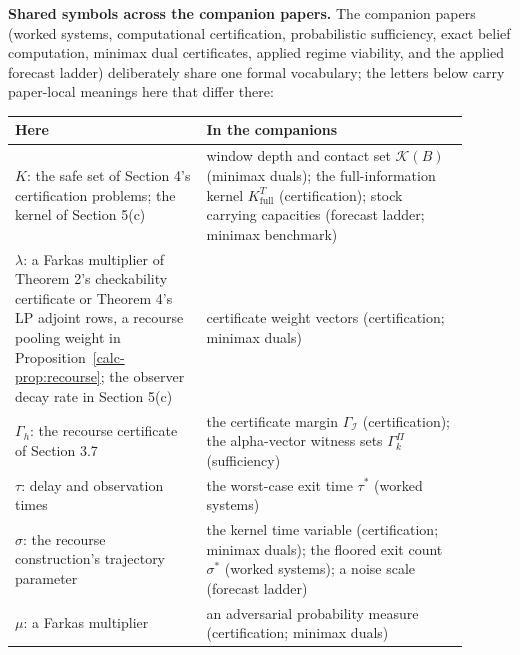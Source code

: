 \documentclass[10pt,twocolumn]{article}
\theoremstyle{definition}
\begin{document}
\medskip
\noindent\textbf{Shared symbols across the companion papers.} The
companion papers (worked systems, computational certification,
probabilistic sufficiency, exact belief computation, minimax dual
certificates, applied regime viability, and the applied forecast ladder)
deliberately share one formal vocabulary; the letters below carry
paper-local meanings here that differ there:
\begin{center}\small
\begin{tabular}{@{}p{0.38\linewidth}p{0.52\linewidth}@{}}
\toprule
\textbf{Here} & \textbf{In the companions} \\
\midrule
\(K\): the safe set of Section 4's certification problems; the kernel of Section 5(c) & window depth and contact set \(\mathcal{K}(B)\) (minimax duals); the full-information kernel \(K^{T}_{\mathrm{full}}\) (certification); stock carrying capacities (forecast ladder; minimax benchmark) \\
\(\lambda\): a Farkas multiplier of Theorem 2's checkability certificate or Theorem 4's LP adjoint rows, a recourse pooling weight in Proposition~\ref{calc-prop:recourse}; the observer decay rate in Section 5(c) & certificate weight vectors (certification; minimax duals) \\
\(\Gamma_{h}\): the recourse certificate of Section 3.7 & the certificate margin \(\Gamma_{\mathcal{I}}\) (certification); the alpha-vector witness sets \(\Gamma^{\Pi}_{k}\) (sufficiency) \\
\(\tau\): delay and observation times & the worst-case exit time \(\tau^{*}\) (worked systems) \\
\(\sigma\): the recourse construction's trajectory parameter & the kernel time variable (certification; minimax duals); the floored exit count \(\sigma^{*}\) (worked systems); a noise scale (forecast ladder) \\
\(\mu\): a Farkas multiplier & an adversarial probability measure (certification; minimax duals) \\
\bottomrule
\end{tabular}
\end{center}
\end{document}
